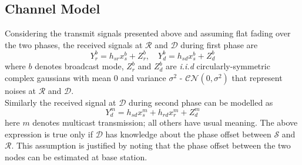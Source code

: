 \subsection{Channel Model}
Considering the transmit signals presented above and assuming flat fading over the two phases, the received signals at $\mathcal{R}$ and $\mathcal{D}$ during first phase are 
\begin{equation}
Y_r^b = h_{sr}x^b_s + Z_r^b , \quad Y_d^b = h_{sd}x^b_s + Z_d^b
\end{equation}
where $b$ denotes broadcast mode, $Z_r^b$ and $Z_d^b$ are \textit{i.i.d} circularly-symmetric complex gaussians with mean 0 and variance $\sigma^2$  - $\mathcal{CN}(0,\sigma^2)$ that represent noises at $\mathcal{R}$ and $\mathcal{D}$. \\
Similarly the received signal at $\mathcal{D}$ during second phase can be modelled as 
\begin{equation}
Y_d^m = h_{sd}x^m_s + h_{rd}x_r^m + Z_d^m
\end{equation}
here $m$ denotes multicast transmission; all others have usual meaning.
The above expression is true only if $\mathcal{D}$ has knowledge about the phase offset between $\mathcal{S}$ and $\mathcal{R}$. This assumption is justified by noting that the phase offset between the two nodes can be estimated at base station.

